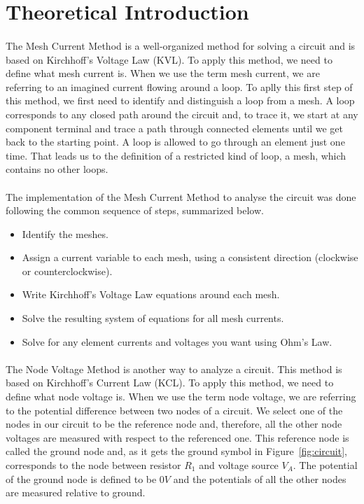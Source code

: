 \section{Theoretical Introduction}
\label{sec:theoretical}

\paragraph{}
The Mesh Current Method is a well-organized method for solving a circuit and is based on Kirchhoff's Voltage Law (KVL). To apply this method, we need to define what mesh current is. When we use the term mesh current, we are referring to an imagined current flowing around a loop. To aplly this first step of this method, we first need to identify and distinguish a loop from a mesh. A loop corresponds to any closed path around the circuit and, to trace it, we start at any component terminal and trace a path through connected elements until we get back to the starting point. A loop is allowed to go through an element just one time. That leads us to the definition of a restricted kind of loop, a mesh, which contains no other loops.

\paragraph{}
The implementation of the Mesh Current Method to analyse the circuit was done following the common sequence of steps, summarized below.
\begin{itemize}
    \item Identify the meshes.
    \item Assign a current variable to each mesh, using a consistent direction (clockwise or counterclockwise).
    \item Write Kirchhoff's Voltage Law equations around each mesh.
    \item Solve the resulting system of equations for all mesh currents.
    \item Solve for any element currents and voltages you want using Ohm's Law.
\end{itemize}

\paragraph{}
The Node Voltage Method is another way to analyze a circuit. This method is based on Kirchhoff's Current Law (KCL). To apply this method, we need to define what node voltage is. When we use the term node voltage, we are referring to the potential difference between two nodes of a circuit. We select one of the nodes in our circuit to be the reference node and, therefore, all the other node voltages are measured with respect to the referenced one. This reference node is called the ground node and, as it gets the ground symbol in Figure~\ref{fig:circuit}, corresponds to the node between resistor $R_1$ and voltage source $V_A$. The potential of the ground node is defined to be $0 V$ and the potentials of all the other nodes are measured relative to ground.

